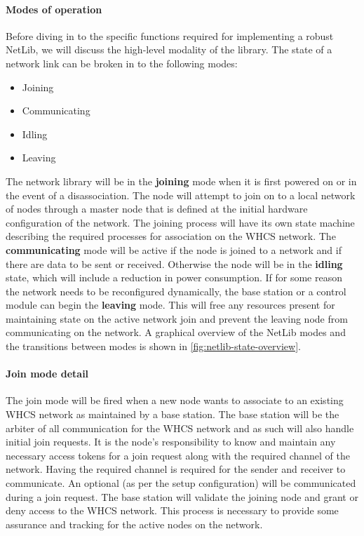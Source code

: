 \paragraph{Modes of operation}
Before diving in to the specific functions required for implementing a robust
NetLib, we will discuss the high-level modality of the library. The state of a
network link can be broken in to the following modes:

\begin{itemize}
  \item Joining
  \item Communicating
  \item Idling
  \item Leaving
\end{itemize}

The network library will be in the \textbf{joining} mode when it is first
powered on or in the event of a disassociation. The node will attempt to join
on to a local network of nodes through a master node that is defined at the
initial hardware configuration of the network. The joining process will have
its own state machine describing the required processes for association on the
WHCS network. The \textbf{communicating} mode will be active if the node is
joined to a network and if there are data to be sent or received. Otherwise the
node will be in the \textbf{idling} state, which will include a reduction in
power consumption. If for some reason the network needs to be reconfigured
dynamically, the base station or a control module can begin the
\textbf{leaving} mode. This will free any resources present for maintaining
state on the active network join and prevent the leaving node from
communicating on the network. A graphical overview of the NetLib modes and the
transitions between modes is shown in \autoref{fig:netlib-state-overview}.


\paragraph{Join mode detail}
The join mode will be fired when a new node wants to associate to an existing
WHCS network as maintained by a base station. The base station will be the
arbiter of all communication for the WHCS network and as such will also handle
initial join requests. It is the node's responsibility to know and maintain any
necessary access tokens for a join request along with the required channel of
the network. Having the required channel is required for the sender and
receiver to communicate. An optional (as per the setup configuration) will be
communicated during a join request. The base station will validate the joining
node and grant or deny access to the WHCS network. This process is necessary to
provide some assurance and tracking for the active nodes on the network.


